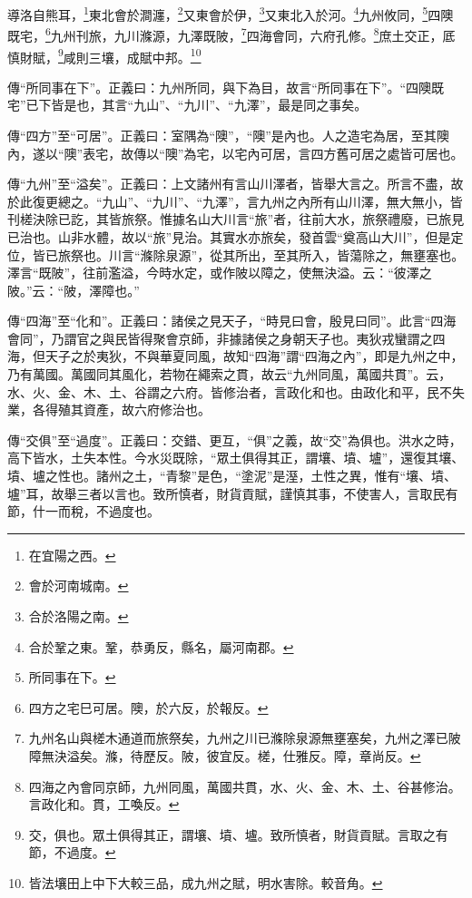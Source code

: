 導洛自熊耳，\footnote{在宜陽之西。}東北會於澗瀍，\footnote{會於河南城南。}又東會於伊，\footnote{合於洛陽之南。}又東北入於河。\footnote{合於鞏之東。鞏，恭勇反，縣名，屬河南郡。}九州攸同，\footnote{所同事在下。}四隩既宅，\footnote{四方之宅巳可居。隩，於六反，於報反。}九州刊旅，九川滌源，九澤既陂，\footnote{九州名山與槎木通道而旅祭矣，九州之川已滌除泉源無壅塞矣，九州之澤已陂障無決溢矣。滌，待歷反。陂，彼宜反。槎，仕雅反。障，章尚反。}四海會同，六府孔修。\footnote{四海之內會同京師，九州同風，萬國共貫，水、火、金、木、土、谷甚修治。言政化和。貫，工喚反。}庶土交正，厎慎財賦，\footnote{交，俱也。眾土俱得其正，謂壤、墳、壚。致所慎者，財貨貢賦。言取之有節，不過度。}咸則三壤，成賦中邦。\footnote{皆法壤田上中下大較三品，成九州之賦，明水害除。較音角。}

{\noindent\zhuan{}\fzbyks 傳“所同事在下”。正義曰：九州所同，與下為目，故言“所同事在下”。“四隩既宅”已下皆是也，其言“九山”、“九川”、“九澤”，最是同之事矣。 \par}

{\noindent\zhuan{}\fzbyks 傳“四方”至“可居”。正義曰：室隅為“隩”，“隩”是內也。人之造宅為居，至其隩內，遂以“隩”表宅，故傳以“隩”為宅，以宅內可居，言四方舊可居之處皆可居也。 \par}

{\noindent\zhuan{}\fzbyks 傳“九州”至“溢矣”。正義曰：上文諸州有言山川澤者，皆舉大言之。所言不盡，故於此復更總之。“九山”、“九川”、“九澤”，言九州之內所有山川澤，無大無小，皆刊槎決除已訖，其皆旅祭。惟據名山大川言“旅”者，往前大水，旅祭禮廢，已旅見已治也。山非水體，故以“旅”見治。其實水亦旅矣，發首雲“奠高山大川”，但是定位，皆已旅祭也。川言“滌除泉源”，從其所出，至其所入，皆蕩除之，無壅塞也。澤言“既陂”，往前濫溢，今時水定，或作陂以障之，使無決溢。云：“彼澤之陂。”云：“陂，澤障也。” \par}

{\noindent\zhuan{}\fzbyks 傳“四海”至“化和”。正義曰：諸侯之見天子，“時見曰會，殷見曰同”。此言“四海會同”，乃謂官之與民皆得聚會京師，非據諸侯之身朝天子也。夷狄戎蠻謂之四海，但天子之於夷狄，不與華夏同風，故知“四海”謂“四海之內”，即是九州之中，乃有萬國。萬國同其風化，若物在繩索之貫，故云“九州同風，萬國共貫”。云，水、火、金、木、土、谷謂之六府。皆修治者，言政化和也。由政化和平，民不失業，各得殖其資產，故六府修治也。 \par}

{\noindent\zhuan{}\fzbyks 傳“交俱”至“過度”。正義曰：交錯、更互，“俱”之義，故“交”為俱也。洪水之時，高下皆水，土失本性。今水災既除，“眾土俱得其正，謂壤、墳、壚”，還復其壤、墳、壚之性也。諸州之土，“青黎”是色，“塗泥”是溼，土性之異，惟有“壤、墳、壚”耳，故舉三者以言也。致所慎者，財貨貢賦，謹慎其事，不使害人，言取民有節，什一而稅，不過度也。 \par}

